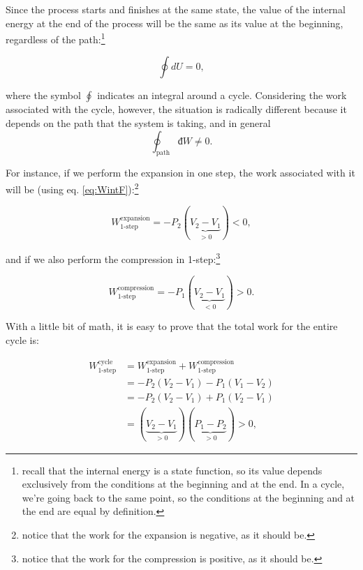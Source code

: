 \documentclass[
  9pt,
]{extbook}
\theoremstyle{definition}
\theoremstyle{definition}
\theoremstyle{definition}
\theoremstyle{remark}
\begin{document}
Since the process starts and finishes at the same state, the value of the internal energy at the end of the process will be the same as its value at the beginning, regardless of the path:\footnote{recall that the internal energy is a state function, so its value depends exclusively from the conditions at the beginning and at the end. In a cycle, we're going back to the same point, so the conditions at the beginning and at the end are equal by definition.}

\begin{equation}
  \oint dU=0,
  \label{eq:de0}
\end{equation}

where the symbol \(\oint\) indicates an integral around a cycle. Considering the work associated with the cycle, however, the situation is radically different because it depends on the path that the system is taking, and in general
\begin{equation}
\oint_{\text{path}} đW \neq 0.
  \label{eq:dw0}
\end{equation}

For instance, if we perform the expansion in one step, the work associated with it will be (using eq. \eqref{eq:WintF}):\footnote{notice that the work for the expansion is negative, as it should be.}

\begin{equation}
  W^{\text{expansion}}_{\text{1-step}}=-P_2(\underbrace{V_2-V_1}_{>0})<0,
  \label{eq:Wexp1}
\end{equation}

and if we also perform the compression in 1-step:\footnote{notice that the work for the compression is positive, as it should be.}

\begin{equation}
  W^{\text{compression}}_{\text{1-step}}=-P_1(\underbrace{V_2-V_1}_{<0})>0.
  \label{eq:Wcomp1}
\end{equation}

With a little bit of math, it is easy to prove that the total work for the entire cycle is:

\begin{equation}
\begin{aligned}
W^{\text{cycle}}_{\text{1-step}} {} & =  W^{\text{expansion}}_{\text{1-step}}+W^{\text{compression}}_{\text{1-step}} \\
 & = -P_2(V_2-V_1)-P_1(V_1-V_2) \\
 & = -P_2(V_2-V_1)+P_1(V_2-V_1) \\
 & = (\underbrace{V_2-V_1}_{>0})(\underbrace{P_1-P_2}_{>0}) > 0,
\end{aligned}
  \label{eq:Wtot1}
\end{equation}
\end{document}
